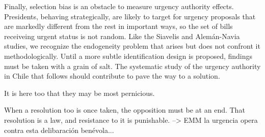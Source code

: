 Finally, selection bias is an obstacle to measure urgency authority effects. Presidents, behaving strategically, are likely to target for urgency proposals that are markedly different from the rest in important ways, so the set of bills receiveing urgent status is not random. Like the Siavelis and Alemán-Navia studies, we recognize the endogeneity problem that arises but does not confront it methodologically. Until a more subtle identification design is proposed, findings must be taken with a grain of salt. The systematic study of the urgency authority in Chile that follows should contribute to pave the way to a solution. 






It is here too that they may be most pernicious.


When a resolution too is once taken, the opposition must be at an end. That resolution is a law, and resistance to it is punishable. --> EMM la urgencia opera contra esta delibaración benévola...

